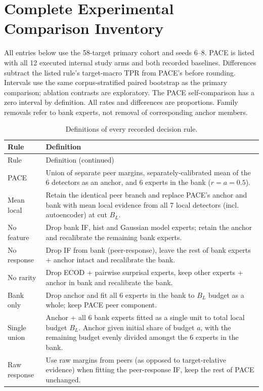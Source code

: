 \section{Complete Experimental Comparison Inventory}
\label{app:inventory}
\setcounter{table}{0}
All entries below use the 58-target primary cohort and seeds 6--8. PACE is listed with all 12 executed internal study arms and both recorded baselines. Differences subtract the listed rule's target-macro TPR from PACE's before rounding. Intervals use the same corpus-stratified paired bootstrap as the primary comparison; ablation contrasts are exploratory. The PACE self-comparison has a zero interval by definition. All rates and differences are proportions. Family removals refer to bank experts, not removal of corresponding anchor members.

{\small
\begin{longtable}{p{}p{}}
\caption{Definitions of every recorded decision rule.}\label{tab:arm-definitions}\\
\toprule Rule & Definition\\\midrule\endfirsthead
\toprule Rule & Definition (continued)\\\midrule\endhead
\bottomrule\endfoot 
PACE & Union of separate peer margins, separately-calibrated mean of the 6 detectors as an anchor, and 6 experts in the bank ($r=a=0.5$).\\
Mean local & Retain the identical peer branch and replace PACE's anchor and bank with mean local evidence from all 7 local detectors (incl. autoencoder) at cut $B_L$.\\
No feature & Drop bank IF, hist and Gaussian model experts; retain the anchor and recalibrate the remaining bank experts.\\
No response & Drop IF from bank (peer-response), leave the rest of bank experts + anchor intact and recalibrate the bank.\\
No rarity & Drop ECOD + pairwise surprisal experts, keep other experts + anchor in bank and recalibrate the bank.\\
Bank only & Drop anchor and fit all 6 experts in the bank to $B_L$ budget as a whole; keep PACE peer component.\\
Single union & Anchor + all 6 bank experts fitted as a single unit to total local budget $B_L$. Anchor given initial share of budget $a$, with the remaining budget evenly divided amongst the 6 experts in the bank.\\
Raw response & Use raw margins from peers (as opposed to target-relative evidence) when fitting the peer-response IF, keep the rest of PACE unchanged.\\

\end{longtable}}

